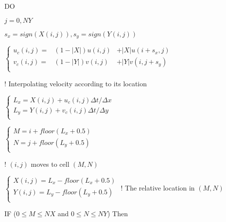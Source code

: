 \documentclass[review]{elsarticle}
\theoremstyle{plain}\newtheorem{definition}{\sc{Definition}}
\theoremstyle{defination}\newtheorem{example}{Example}[section]
\numberwithin{equation}{section}
\numberwithin{table}{section}
\begin{document}
{{{\hspace{1.1cm} {\color{black!60!blue!80}DO}
{ \color{black!80} $j=0,NY$

\vspace{0.1cm}
 \hspace{1.5cm} $s_x=sign(X(i,j)), s_y=sign(Y(i,j))$

 \hspace{1.5cm}	$\left\{
  \begin{array}{rlr}
u_c(i,j)=&(1-|X|)u(i,j)&+|X|u(i+s_x,j)\\
v_c(i,j)=&(1-|Y|)v(i,j)&+|Y|v(i,j+s_y)\\
	\end{array}
  \right.$}
 \hspace{0.8cm}
   \color{black!60} ! Interpolating velocity according to its location \color{black!80}

 \hspace{1.5cm}	$\left\{
  \begin{array}{l}
	L_x=X(i,j)+u_c(i,j)\Delta t/ \Delta x\\
    L_y=Y(i,j)+v_c(i,j)\Delta t/ \Delta y\\
	\end{array}
	\right.$

 \hspace{1.5cm}	$\left\{
  \begin{array}{l}
	M=i+floor(L_x+0.5)\\
    N=j+floor(L_y+0.5)\\
	\end{array}
  \right.$}
  { \color{black!60} \hspace{3.4cm}
! $(i,j)$ moves to cell $(M,N)$} {\color{black!80}

 \hspace{1.5cm}	$\left\{
  \begin{array}{l}
	X(i,j)=L_x-floor(L_x+0.5)\\
    Y(i,j)=L_y-floor(L_y+0.5)\\
	\end{array}
	\right.$
	{ \color{black!60} \hspace{2.6cm}
! The relative location in $(M,N)$} {\color{black!80}

\vspace{0.1cm}
\hspace{1.5cm} \color{black!60!blue!80} IF
\color{black!70} ($0 \leqslant M \leqslant NX$ and $0 \leqslant N \leqslant NY$)
\color{black!60!blue!80} Then
\color{black!80}
\vspace{0.1cm}

}}}}
\end{document}
